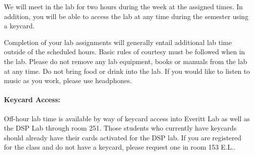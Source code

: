\documentclass[11pt]{handout}
\begin{document}
We will meet in the lab for two hours during the week at the
assigned times.  In addition, you will be able to access
the lab at any time during the semester using a keycard.

Completion of your lab assignments will generally 
entail additional lab time outside of the scheduled hours.
Basic rules of courtesy must be followed when in the lab.  
Please do not remove any lab equipment, books or manuals from 
the lab at any time.  Do not bring food or drink into the lab.
If you would like to listen to music as you work, please use 
headphones.  


\paragraph{Keycard Access:}
Off-hour lab time is available by way of keycard access into
Everitt Lab as well as the DSP Lab through room 251.  Those
students who currently have keycards should already have
their cards activated for the DSP lab.  If you are registered
for the class and do not have a keycard, please request one  
in room 153 E.L..

%
\end{document}
